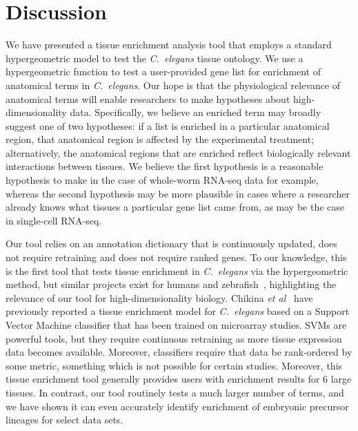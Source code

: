 \documentclass{bmcart}
\begin{document}
\section*{Discussion}
We have presented a tissue enrichment analysis tool that employs a standard hypergeometric model to test the \emph{C.~elegans} tissue ontology. We use a hypergeometric function to test a user-provided gene list for enrichment of anatomical terms in \emph{C.~elegans}. Our hope is that the physiological relevance of anatomical terms will enable researchers to make hypotheses about high-dimensionality data. Specifically, we believe an enriched term may broadly suggest one of two hypotheses: if a list is enriched in a particular anatomical region, that anatomical region is affected by the experimental treatment; alternatively, the anatomical regions that are enriched reflect biologically relevant interactions between tissues. We believe the first hypothesis is a reasonable hypothesis to make in the case of whole-worm RNA-seq data for example, whereas the second hypothesis may be more plausible in cases where a researcher already knows what tissues a particular gene list came from, as may be the case in single-cell RNA-seq. 

Our tool relies on an annotation dictionary that is continuously updated, does not require retraining and does not require ranked genes. To our knowledge, this is the first tool that tests tissue enrichment  in \emph{C.~elegans} via the hypergeometric method, but similar projects exist for humans and zebrafish~\cite{Lee2013, Prykhozhij2013}, highlighting the relevance of our tool for high-dimensionality biology. Chikina \emph{et al}~\cite{Chikina2009} have previously reported a tissue enrichment model for \emph{C.~elegans }based on a Support Vector Machine classifier that has been trained on microarray studies. SVMs are powerful tools, but they require continuous retraining as more tissue expression data becomes available. Moreover, classifiers require that data be rank-ordered by some metric, something which is not possible for certain studies. Moreover, this tissue enrichment tool generally provides users with enrichment results for 6 large tissues. In contrast, our tool routinely tests a much larger number of terms, and we have shown it can even accurately identify enrichment of embryonic precursor lineages for select data sets. 
\end{document}
